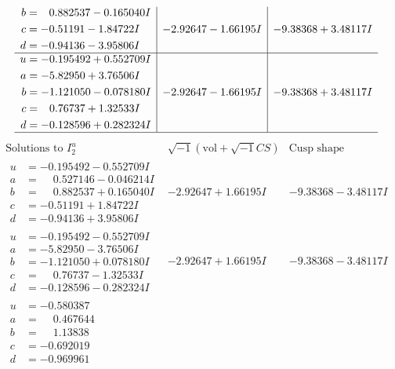 \documentclass[1p]{elsarticle_modified}
\theoremstyle{definition}
\newcommand{\I}{\sqrt{-1}}
\begin{document}
$$\begin{array}{c|c|c}
\begin{aligned}
b &= \phantom{-}0.882537 - 0.165040 I \\
c &= -0.51191 - 1.84722 I \\
d &= -0.94136 - 3.95806 I\end{aligned}
 & -2.92647 - 1.66195 I & -9.38368 + 3.48117 I \\ \hline\begin{aligned}
u &= -0.195492 + 0.552709 I \\
a &= -5.82950 + 3.76506 I \\
b &= -1.121050 - 0.078180 I \\
c &= \phantom{-}0.76737 + 1.32533 I \\
d &= -0.128596 + 0.282324 I\end{aligned}
 & -2.92647 - 1.66195 I & -9.38368 + 3.48117 I\\
 \hline 
 \end{array}$$\newpage$$\begin{array}{c|c|c}  
\text{Solutions to }I^u_{2}& \I (\text{vol} + \sqrt{-1}CS) & \text{Cusp shape}\\
 \hline 
\begin{aligned}
u &= -0.195492 - 0.552709 I \\
a &= \phantom{-}0.527146 - 0.046214 I \\
b &= \phantom{-}0.882537 + 0.165040 I \\
c &= -0.51191 + 1.84722 I \\
d &= -0.94136 + 3.95806 I\end{aligned}
 & -2.92647 + 1.66195 I & -9.38368 - 3.48117 I \\ \hline\begin{aligned}
u &= -0.195492 - 0.552709 I \\
a &= -5.82950 - 3.76506 I \\
b &= -1.121050 + 0.078180 I \\
c &= \phantom{-}0.76737 - 1.32533 I \\
d &= -0.128596 - 0.282324 I\end{aligned}
 & -2.92647 + 1.66195 I & -9.38368 - 3.48117 I \\ \hline\begin{aligned}
u &= -0.580387\phantom{ +0.000000I} \\
a &= \phantom{-}0.467644\phantom{ +0.000000I} \\
b &= \phantom{-}1.13838\phantom{ +0.000000I} \\
c &= -0.692019\phantom{ +0.000000I} \\
d &= -0.969961\phantom{ +0.000000I}\end{aligned}

\end{array}$$
\end{document}
